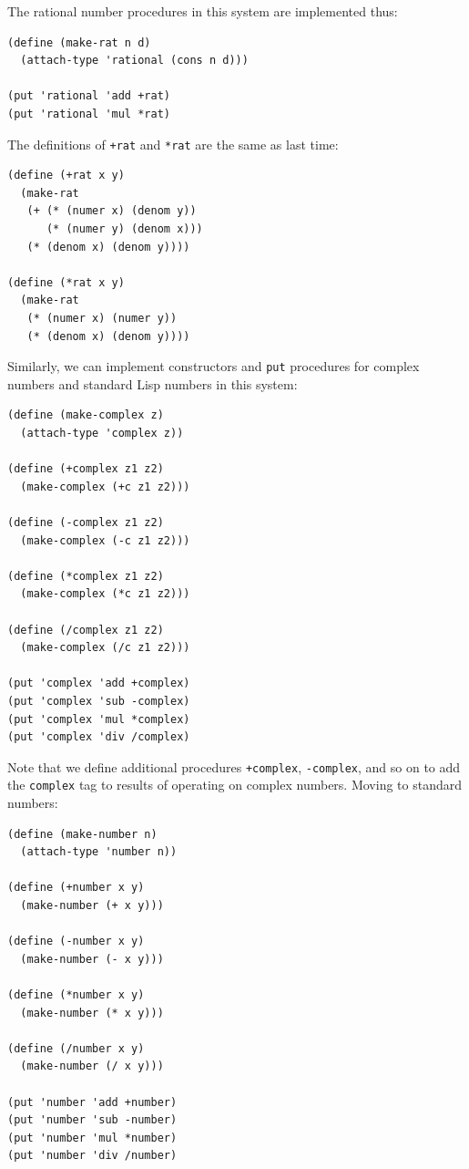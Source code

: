\documentclass[9pt]{report}
\begin{document}
The rational number procedures in this system are implemented thus:

\begin{verbatim}
(define (make-rat n d)
  (attach-type 'rational (cons n d)))

(put 'rational 'add +rat)
(put 'rational 'mul *rat)
\end{verbatim}

The definitions of \texttt{+rat} and \texttt{*rat} are the same as last time:
\begin{verbatim}
(define (+rat x y)
  (make-rat
   (+ (* (numer x) (denom y))
      (* (numer y) (denom x)))
   (* (denom x) (denom y))))

(define (*rat x y)
  (make-rat
   (* (numer x) (numer y))
   (* (denom x) (denom y))))
\end{verbatim}

Similarly, we can implement constructors and \texttt{put} procedures for
complex numbers and standard Lisp numbers in this system:

\begin{verbatim}
(define (make-complex z)
  (attach-type 'complex z))

(define (+complex z1 z2)
  (make-complex (+c z1 z2)))

(define (-complex z1 z2)
  (make-complex (-c z1 z2)))

(define (*complex z1 z2)
  (make-complex (*c z1 z2)))

(define (/complex z1 z2)
  (make-complex (/c z1 z2)))

(put 'complex 'add +complex)
(put 'complex 'sub -complex)
(put 'complex 'mul *complex)
(put 'complex 'div /complex)
\end{verbatim}

Note that we define additional procedures \texttt{+complex}, \texttt{-complex},
and so on to add the \texttt{complex} tag to results of operating on
complex numbers. Moving to standard numbers:

\begin{verbatim}
(define (make-number n)
  (attach-type 'number n))

(define (+number x y)
  (make-number (+ x y)))

(define (-number x y)
  (make-number (- x y)))

(define (*number x y)
  (make-number (* x y)))

(define (/number x y)
  (make-number (/ x y)))

(put 'number 'add +number)
(put 'number 'sub -number)
(put 'number 'mul *number)
(put 'number 'div /number)
\end{verbatim}
\end{document}

